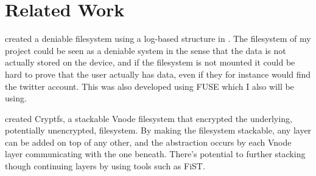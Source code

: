 \section{Related Work}
\citeauthor{petersDEFYDeniableFile2014} created a deniable filesystem using a log-based structure in \citeyear{petersDEFYDeniableFile2014}\cite{petersDEFYDeniableFile2014}. The filesystem of my project could be seen as a deniable system in the sense that the data is not actually stored on the device, and if the filesystem is not mounted it could be hard to prove that the user actually has data, even if they for instance would find the twitter account. This was also developed using FUSE\cite{Libfuse2021} which I also will be using.

\citeauthor{zadokCryptfsStackableVnode} created Cryptfs, a stackable Vnode filesystem that encrypted the underlying, potentially unencrypted, filesystem\cite{zadokCryptfsStackableVnode}. By making the filesystem stackable, any layer can be added on top of any other, and the abstraction occurs by each Vnode layer communicating with the one beneath. There's potential to further stacking though continuing layers by using tools such as FiST\cite{FiSTStackableFile}.